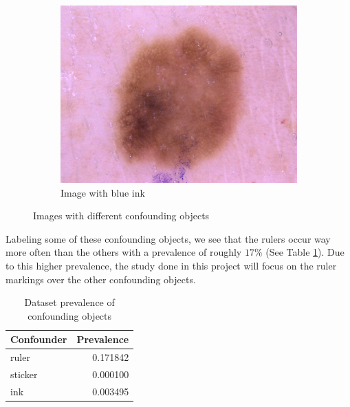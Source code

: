 \documentclass[11pt,a4paper]{article}
\begin{document}
\begin{figure}[ht]
\begin{center}
\begin{subfigure}[b]{0.3\textwidth}
            \includegraphics[width=\textwidth]{./images/ISIC_0027514.jpg}
            \caption{Image with blue ink}
        \end{subfigure}
    \end{center}
    \caption{Images with different confounding objects}
    \label{fig:confounding_objects}
\end{figure}

Labeling some of these confounding objects, we see that the rulers occur way more often than the others with a prevalence of roughly $17\%$ (See Table \ref{table:confounding_objects}).
Due to this higher prevalence, the study done in this project will focus on the ruler markings over the other confounding objects.

\begin{table}
    \centering
    \begin{tabular}{|l|r|}
        \hline 
        Confounder &  Prevalence \\ \hline
        ruler   &  0.171842 \\ \hline
        sticker &  0.000100 \\ \hline
        ink     &  0.003495 \\ \hline
    \end{tabular}
    \caption{Dataset prevalence of confounding objects}
    \label{table:confounding_objects}
\end{table}


\pagebreak

\printbibliography[title={Litterature}]
\end{document}
